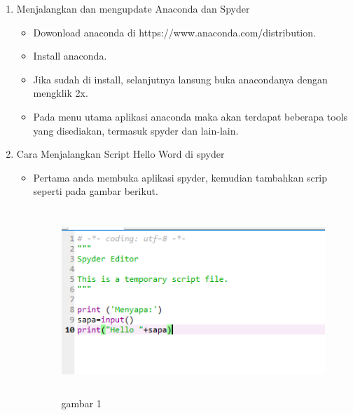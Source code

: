\begin{enumerate}
\item Menjalangkan dan mengupdate Anaconda dan Spyder

\begin{itemize}
\item Dowonload anaconda di https://www.anaconda.com/distribution.
\item Install anaconda.
\item Jika sudah di install, selanjutnya lansung buka anacondanya dengan mengklik 2x.
\item Pada menu utama aplikasi anaconda maka akan terdapat beberapa tools yang disediakan, termasuk spyder dan lain-lain.
\end{itemize}


\item Cara Menjalangkan Script Hello Word di spyder
\begin{itemize}
\item Pertama anda membuka aplikasi spyder, kemudian tambahkan scrip seperti pada gambar berikut.
	\begin{figure}
		\begin{center}
			\includegraphics[width = 10cm, height= 7cm]{gambar_1.PNG}
			\caption{gambar 1}
		\end{center}
	\end{figure}
\end{itemize}



\end{enumerate}
